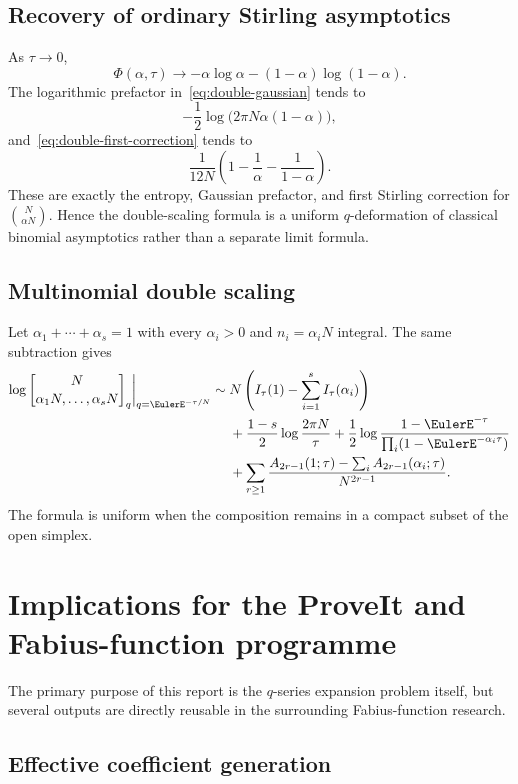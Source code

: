 \documentclass[11pt,oneside]{article}
\theoremstyle{definition}
\theoremstyle{remark}
\newcommand{\qmultinom}[2]{\genfrac{[}{]}{0pt}{}{#1}{#2}_{q}}
\let\reporttopsection\section
\let\reportsubsection\subsection
\let\chapter\reporttopsection
\let\section\reportsubsection
\begin{document}
\section{Recovery of ordinary Stirling asymptotics}

As $\tau\to0$,
\[
 \Phi(\alpha,\tau)\longrightarrow
 -\alpha\log\alpha-(1-\alpha)\log(1-\alpha).
\]
The logarithmic prefactor in~\eqref{eq:double-gaussian} tends to
\[
 -\frac12\log\bigl(2\pi N\alpha(1-\alpha)\bigr),
\]
and~\eqref{eq:double-first-correction} tends to
\[
 \frac1{12N}
 \left(1-\frac1\alpha-\frac1{1-\alpha}\right).
\]
These are exactly the entropy, Gaussian prefactor, and first Stirling
correction for $\binom N{\alpha N}$.  Hence the double-scaling formula is a
uniform $q$-deformation of classical binomial asymptotics rather than a separate
limit formula.

\section{Multinomial double scaling}

Let $\alpha_1+\cdots+\alpha_s=1$ with every $\alpha_i>0$ and
$n_i=\alpha_iN$ integral.  The same subtraction gives
\begin{align}
 \log\qmultinom{N}{\alpha_1N,\ldots,\alpha_sN}
 \bigg|_{q=\EulerE^{-\tau/N}}
 \sim{}&N\left(I_\tau(1)-\sum_{i=1}^{s}I_\tau(\alpha_i)\right)
 \notag\\
 &+\frac{1-s}{2}\log\frac{2\pi N}{\tau}
 +\frac12\log\frac{1-\EulerE^{-\tau}}
 {\prod_i(1-\EulerE^{-\alpha_i\tau})}
 \notag\\
 &+\sum_{r\ge1}\frac{
 A_{2r-1}(1;\tau)-\sum_iA_{2r-1}(\alpha_i;\tau)}
 {N^{2r-1}}.                                      \label{eq:double-multinomial}
\end{align}
The formula is uniform when the composition remains in a compact subset of the
open simplex.

\chapter{Implications for the ProveIt and Fabius-function programme}
\label{chap:fabius-implications}

The primary purpose of this report is the $q$-series expansion problem itself,
but several outputs are directly reusable in the surrounding Fabius-function
research.

\section{Effective coefficient generation}
\end{document}
